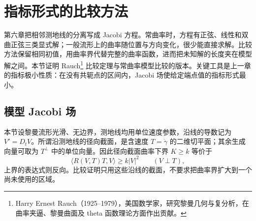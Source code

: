 
% 
% 

\section{指标形式的比较方法}
\label{g3:sec:0701}

第六章把相邻测地线的分离写成 Jacobi 方程。常曲率时，方程有正弦、线性和双曲正弦三类显式解；一般流形上的曲率随位置与方向变化，很少能直接求解。比较方法保留相同初值，用曲率界代替完整的曲率函数，进而把未知解的长度夹在模型解之间。本节证明 Rauch\footnote{Harry Ernest Rauch（1925--1979），美国数学家，研究黎曼几何与复分析，在曲率夹逼、黎曼曲面及 theta 函数理论方面作出贡献。} 比较定理与常曲率模型比较的版本。关键工具是上一章的指标极小性质：在没有共轭点的区间内，Jacobi 场使给定端点值的指标形式最小。

\subsection{模型 Jacobi 场}
\label{g3:subsec:0701:01}

本节设黎曼流形光滑、无边界，测地线均用单位速度参数，沿线的导数记为 \(V'=D_tV\)。所谓沿测地线的径向截面，是含速度 \(T=\dot\gamma\) 的二维切平面；其余生成向量可取为 \(T^\perp\) 中的单位向量。因此径向截面曲率下界 \(K\ge k\) 等价于
\[
	\langle R(V,T)T,V\rangle\ge k|V|^2
	\qquad(V\perp T),
\]
上界的表达式则反向。比较证明只用这些沿线的截面，不要求把曲率界扩大到一个尚未使用的区域。

\ProseParagraphBreak

